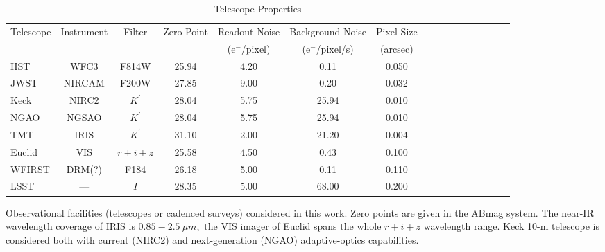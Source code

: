 \documentclass[a4paper,11pt]{article}
\begin{document}
\clearpage
\begin{table}\footnotesize
\begin{center}
\caption{Telescope Properties}
\begin{tabular}{lccccccccccccccc|}
\hline \hline
Telescope & Instrument & Filter & Zero Point & Readout Noise & Background Noise & Pixel Size \\
 & & & & (e$^-$/pixel) & (e$^-$/pixel/s) & (arcsec) \\
\hline
HST  & WFC3  &   F814W   &   25.94    &   4.20      &    0.11     &     0.050    \\
  JWST & NIRCAM  &   F200W   &    27.85   &    9.00     &     0.20    &      0.032  \\
  Keck & NIRC2  &  $K^\prime$ &   28.04    &   5.75     &  25.94      &  0.010      \\
 NGAO & NGSAO  &   $K^\prime$  &     28.04  &     5.75   &    25.94    &    0.010     \\
  TMT & IRIS  &  $K^\prime$   &  31.10   &  2.00   &     21.20    &      0.004  \\
  Euclid & VIS & $r+i+z$  &    25.58   &      4.50   &     0.43    &      0.100   \\
  WFIRST &  DRM(?) & F184    &   26.18    &     5.00    &    0.11     &     0.110   \\
  LSST   & ---  &   $I$    &     28.35  &       5.00  &      68.00   &        0.200  \\
\hline
\hline
\end{tabular}
\begin{tablenotes}
\item 
Observational facilities (telescopes or cadenced surveys) considered in this work.
 Zero points are given in the ABmag system. The near-IR wavelength coverage of IRIS is $0.85-2.5~\mu m,$ the VIS imager of Euclid spans the whole $r+i+z$ wavelength range. Keck 10-m telescope is considered both with current (NIRC2) and next-generation (NGAO) adaptive-optics capabilities.\\
\end{tablenotes}
\label{tab:telescopes parameters}
\end{center}
\end{table}
\end{document}
